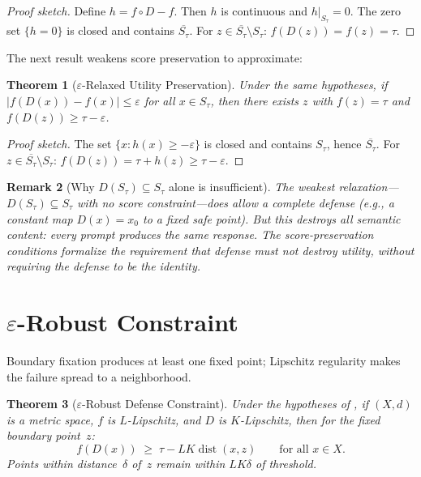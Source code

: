 \documentclass{article}
\newtheorem{theorem}{Theorem}[section]
\newtheorem{remark}[theorem]{Remark}
\newcommand{\cl}[1]{\overline{#1}}
\newcommand{\dist}{\operatorname{dist}}
\begin{document}
\begin{proof}[Proof sketch]
Define $h = f \circ D - f$. Then $h$ is continuous and $h|_{S_\tau} = 0$.
The zero set $\{h = 0\}$ is closed and contains $\cl{S_\tau}$. For
$z \in \cl{S_\tau} \setminus S_\tau$: $f(D(z)) = f(z) = \tau$.
\end{proof}

The next result weakens score preservation to approximate:

\begin{theorem}[$\varepsilon$-Relaxed Utility Preservation]
\label{thm:eps-relaxed}
Under the same hypotheses, if
$|f(D(x)) - f(x)| \leq \varepsilon$ for all $x \in S_\tau$, then
there exists $z$ with $f(z) = \tau$ and
$f(D(z)) \geq \tau - \varepsilon$.
\end{theorem}

\begin{proof}[Proof sketch]
The set $\{x : h(x) \geq -\varepsilon\}$ is closed and contains
$S_\tau$, hence $\cl{S_\tau}$. For
$z \in \cl{S_\tau} \setminus S_\tau$:
$f(D(z)) = \tau + h(z) \geq \tau - \varepsilon$.
\end{proof}


\begin{remark}[Why $D(S_\tau) \subseteq S_\tau$ alone is insufficient]
\label{rem:safe-preserving-escape}
The weakest relaxation---$D(S_\tau) \subseteq S_\tau$ with no score
constraint---does allow a complete defense (e.g., a constant map
$D(x) = x_0$ to a fixed safe point). But this destroys all semantic
content: every prompt produces the same response. The score-preservation
conditions formalize the requirement that defense must not destroy
utility, without requiring the defense to be the identity.
\end{remark}


\section{$\varepsilon$-Robust Constraint}
\label{sec:eps-robust}

Boundary fixation produces at least one fixed point; Lipschitz
regularity makes the failure spread to a neighborhood.

\begin{theorem}[$\varepsilon$-Robust Defense Constraint]
\label{thm:eps-robust}
Under the hypotheses of , if $(X,d)$ is a metric
space, $f$ is $L$-Lipschitz, and $D$ is $K$-Lipschitz, then for
the fixed boundary point~$z$:
\begin{equation}
  f(D(x)) \;\geq\; \tau - LK\dist(x, z)
  \qquad \text{for all } x \in X.
\end{equation}
Points within distance~$\delta$ of~$z$ remain within
$LK\delta$ of threshold.
\end{theorem}
\end{document}
